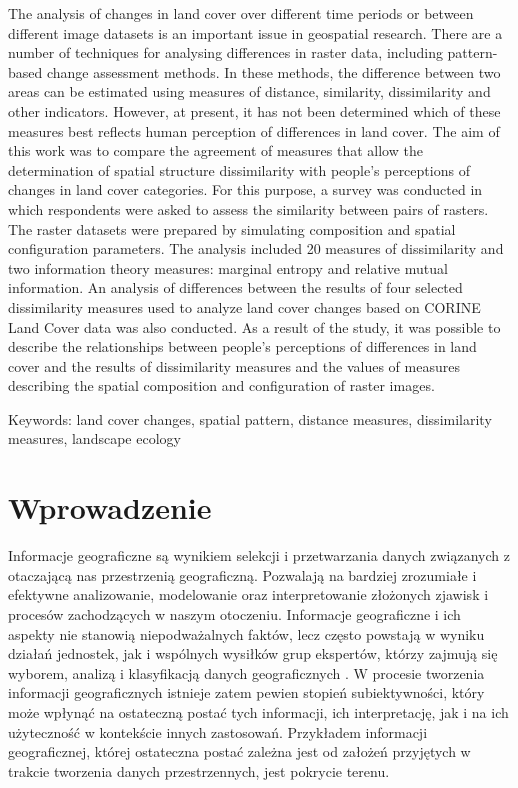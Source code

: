 \documentclass{amuthesis}
\begin{document}
The analysis of changes in land cover over different time periods or
between different image datasets is an important issue in geospatial
research. There are a number of techniques for analysing differences in
raster data, including pattern-based change assessment methods. In these
methods, the difference between two areas can be estimated using
measures of distance, similarity, dissimilarity and other indicators.
However, at present, it has not been determined which of these measures
best reflects human perception of differences in land cover. The aim of
this work was to compare the agreement of measures that allow the
determination of spatial structure dissimilarity with people's
perceptions of changes in land cover categories. For this purpose, a
survey was conducted in which respondents were asked to assess the
similarity between pairs of rasters. The raster datasets were prepared
by simulating composition and spatial configuration parameters. The
analysis included 20 measures of dissimilarity and two information
theory measures: marginal entropy and relative mutual information. An
analysis of differences between the results of four selected
dissimilarity measures used to analyze land cover changes based on
CORINE Land Cover data was also conducted. As a result of the study, it
was possible to describe the relationships between people's perceptions
of differences in land cover and the results of dissimilarity measures
and the values of measures describing the spatial composition and
configuration of raster images.

Keywords: land cover changes, spatial pattern, distance measures,
dissimilarity measures, landscape ecology

\newpage

\sf\tighttoc\doublespacing


\hypertarget{sec-wprowadzenie}{%
\chapter{Wprowadzenie}\label{sec-wprowadzenie}}

Informacje geograficzne są wynikiem selekcji i przetwarzania danych
związanych z otaczającą nas przestrzenią geograficzną. Pozwalają na
bardziej zrozumiałe i efektywne analizowanie, modelowanie oraz
interpretowanie złożonych zjawisk i procesów zachodzących w naszym
otoczeniu. Informacje geograficzne i ich aspekty nie stanowią
niepodważalnych faktów, lecz często powstają w wyniku działań jednostek,
jak i wspólnych wysiłków grup ekspertów, którzy zajmują się wyborem,
analizą i klasyfikacją danych geograficznych \autocite{WhatIsLandCover}.
W procesie tworzenia informacji geograficznych istnieje zatem pewien
stopień subiektywności, który może wpłynąć na ostateczną postać tych
informacji, ich interpretację, jak i na ich użyteczność w kontekście
innych zastosowań. Przykładem informacji geograficznej, której
ostateczna postać zależna jest od założeń przyjętych w trakcie tworzenia
danych przestrzennych, jest pokrycie terenu.
\end{document}
